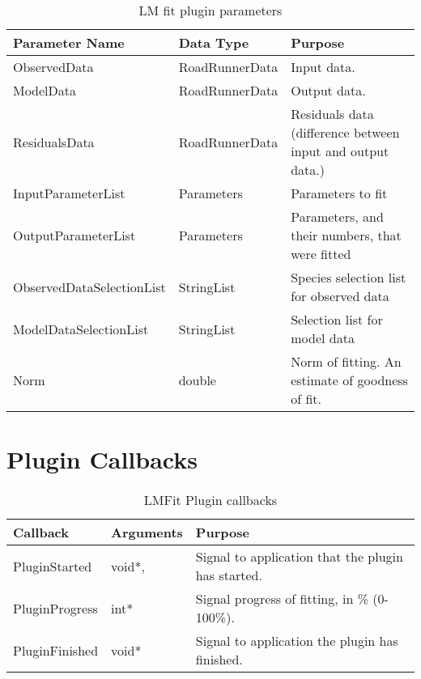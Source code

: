 \begin{table}[ht]
\centering %
\begin{tabular}{l l p{7.5cm}} %

Parameter Name & Data Type & Purpose \\ [0.5ex] %
\hline %
ObservedData   				& 	RoadRunnerData 		& 	Input data.  \\
ModelData      				& 	RoadRunnerData    	& 	Output data. \\
ResidualsData  				& 	RoadRunnerData    	& 	Residuals data (difference between input and output data.) \\
InputParameterList 			&	Parameters   		& 	Parameters to fit \\
OutputParameterList 		&   Parameters  	 	& 	Parameters, and their numbers, that were fitted \\
ObservedDataSelectionList 	& 	StringList			&	Species selection list for observed data \\
ModelDataSelectionList 		& 	StringList			&	Selection list for model data \\
Norm						&	double				& 	Norm of fitting. An estimate of goodness of fit. \\

\hline %
\end{tabular}
\caption{LM fit plugin parameters} 
\label{table:lmfitPluginParameters} 
\end{table}

\section{Plugin Callbacks}
\begin{table}[ht]
\centering %
\begin{tabular}{l l p{7.5cm}} %

Callback & Arguments & Purpose \\ [0.5ex] %
\hline %
PluginStarted  	& 	void*, & Signal to application that the plugin has started. \\
PluginProgress	& 	int*  & Signal progress of fitting, in \% (0-100\%). \\
PluginFinished	& 	void* & Signal to application the plugin has finished. \\

\hline %
\end{tabular}
\caption{LMFit Plugin callbacks} 
\label{table:lmfitPluginCallBacks} 
\end{table}

